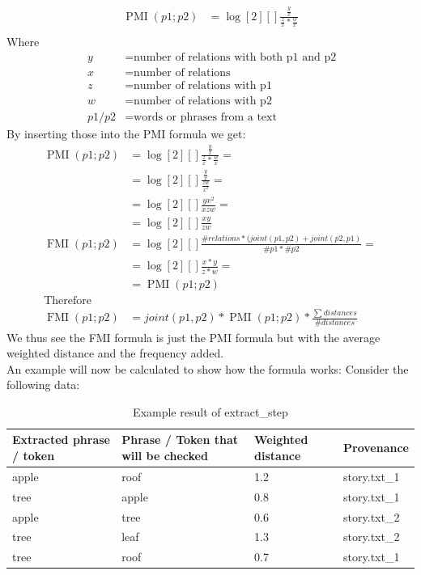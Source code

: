 \begin{align*}
\label{formula:equivalence}
\operatorname{PMI}(p1;p2) &= \log[2][]{\frac{\frac{y}{x}}{\frac{z}{x} * \frac{w}{x}}} \\
\end{align*}
Where
\begin{align*}
~y &= \text{number of relations with both p1 and p2}\\
~x &= \text{number of relations}\\
~z &= \text{number of relations with p1}\\
~w &= \text{number of relations with p2}\\
~p1/p2 &= \text{words or phrases from a text}
\end{align*}
By inserting those into the PMI formula we get:
\begin{align*}
\operatorname{PMI}(p1;p2) &= \log[2][]{\frac{\frac{y}{x}}{\frac{z}{x} * \frac{w}{x}}} =\\
                          &= \log[2][]{\frac{\frac{y}{x}}{\frac{zw}{x^2}}} =\\
                          &= \log[2][]{\frac{yx^2}{xzw}} =\\
                          &= \log[2][]{\frac{xy}{zw}}\\
\operatorname{FMI}(p1;p2) &= \log[2][]{\frac{\#relations * (joint(p1, p2) + joint(p2, p1)}{\#p1 * \#p2}} = \\
    &= \log[2][]{\frac{x * y}{z * w}} = \\
    &= \operatorname{PMI}(p1;p2)\\
\text{Therefore}\\
\operatorname{FMI}(p1;p2) &= joint(p1, p2) * \operatorname{PMI}(p1;p2) * \frac{\sum{}{distances}}{\#distances}
\end{align*}
We thus see the FMI formula is just the PMI formula but with the average weighted distance and the frequency added. \\
An example will now be calculated to show how the formula works: Consider the following data:
\begin{table}[h!]
\centering
\caption{Example result of extract\_step}
\label{table:extract-example}
\begin{tabular}{l|l|l|l}
Extracted phrase / token & Phrase / Token that will be checked & Weighted distance & Provenance\\ \hline
apple & roof & 1.2 & story.txt\_1\\ \hline
tree & apple & 0.8 & story.txt\_1\\ \hline
apple & tree & 0.6 & story.txt\_2 \\ \hline
\rowcolor{grey!25}tree & leaf & 1.3 & story.txt\_2 \\ \hline
tree & roof & 0.7 & story.txt\_1
\end{tabular}
\end{table}\\
